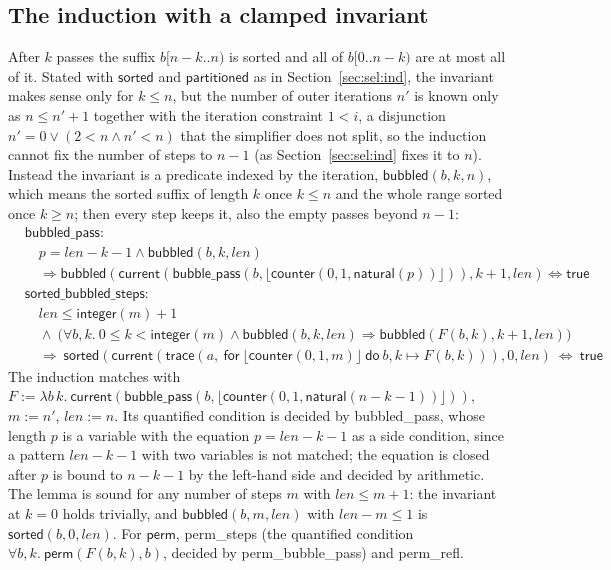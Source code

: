 \documentclass[11pt,a4paper]{article}
\newcommand{\bl}[1]{\lfloor #1\rfloor}                       %
\newcommand{\tr}[3]{\mathsf{trace}(#1,\ \mathsf{for}\ #2\ \mathsf{do}\ #3)}
\newcommand{\cnt}{\mathsf{counter}}
\newcommand{\cur}{\mathsf{current}}
\newcommand{\intf}{\mathsf{integer}}
\newcommand{\natf}{\mathsf{natural}}
\newcommand{\sorted}{\mathsf{sorted}}
\newcommand{\perm}{\mathsf{perm}}
\newcommand{\partitioned}{\mathsf{partitioned}}
\newcommand{\lemma}[1]{\textsf{#1}}
\begin{document}
\subsection{The induction with a clamped invariant}
After $k$ passes the suffix $b[n - k..n)$ is sorted and all of $b[0..n - k)$ are at most all of it. Stated
with $\sorted$ and $\partitioned$ as in Section~\ref{sec:sel:ind}, the invariant makes sense only for $k \le n$, but
the number of outer iterations $n'$ is known only as $n \le n' + 1$ together with the iteration
constraint $1 < i$, a disjunction $n' = 0 \vee (2 < n \wedge n' < n)$ that the simplifier does not split,
so the induction cannot fix the number of steps to $n - 1$ (as Section~\ref{sec:sel:ind} fixes it to $n$). Instead the
invariant is a predicate indexed by the iteration, $\mathsf{bubbled}(b, k, n)$, which means the sorted
suffix of length $k$ once $k \le n$ and the whole range sorted once $k \ge n$; then every step keeps it,
also the empty passes beyond $n - 1$:
\begin{align*}
  &\lemma{bubbled\_pass}:\\
  &\quad p = len - k - 1 \wedge \mathsf{bubbled}(b, k, len)\\
  &\quad\Longrightarrow \mathsf{bubbled}(\cur(\mathsf{bubble\_pass}(b, \bl{\cnt(0, 1, \natf(p))})), k + 1, len)
    \Longleftrightarrow \mathsf{true}\\[4pt]
  &\lemma{sorted\_bubbled\_steps}:\\
  &\quad len \le \intf(m) + 1\\
  &\quad\wedge\ \big(\forall b, k.\ 0 \le k < \intf(m) \wedge \mathsf{bubbled}(b, k, len) \Longrightarrow \mathsf{bubbled}(F(b, k), k + 1, len)\big)\\
  &\quad\Longrightarrow\ \sorted(\cur(\tr{a}{\bl{\cnt(0, 1, m)}}{b, k \mapsto F(b, k)}), 0, len)\ \Longleftrightarrow\ \mathsf{true}
\end{align*}
The induction matches with $F := \lambda b\, k.\ \cur(\mathsf{bubble\_pass}(b, \bl{\cnt(0, 1, \natf(n - k - 1))}))$,
$m := n'$, $len := n$. Its quantified condition is decided by \lemma{bubbled\_pass}, whose length $p$ is a
variable with the equation $p = len - k - 1$ as a side condition, since a pattern $len - k - 1$ with two
variables is not matched; the equation is closed after $p$ is bound to $n - k - 1$ by the left-hand side
and decided by arithmetic. The lemma is sound for any number of steps $m$ with $len \le m + 1$: the
invariant at $k = 0$ holds trivially, and $\mathsf{bubbled}(b, m, len)$ with $len - m \le 1$ is
$\sorted(b, 0, len)$. For $\perm$, \lemma{perm\_steps} (the quantified condition $\forall b, k.\ \perm(F(b, k), b)$,
decided by \lemma{perm\_bubble\_pass}) and \lemma{perm\_refl}.
\end{document}
